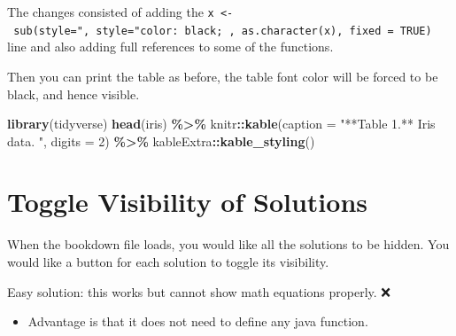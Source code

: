 \documentclass[
  a4paper,
  twoside,
  openright]{book}
\newenvironment{Shaded}{\begin{snugshade}}{\end{snugshade}}
\newcommand{\AttributeTok}[1]{\textcolor[rgb]{0.13,0.29,0.53}{#1}}
\newcommand{\DataTypeTok}[1]{\textcolor[rgb]{0.13,0.29,0.53}{#1}}
\newcommand{\DecValTok}[1]{\textcolor[rgb]{0.00,0.00,0.81}{#1}}
\newcommand{\FunctionTok}[1]{\textcolor[rgb]{0.13,0.29,0.53}{\textbf{#1}}}
\newcommand{\KeywordTok}[1]{\textcolor[rgb]{0.13,0.29,0.53}{\textbf{#1}}}
\newcommand{\NormalTok}[1]{#1}
\newcommand{\OperatorTok}[1]{\textcolor[rgb]{0.81,0.36,0.00}{\textbf{#1}}}
\newcommand{\OtherTok}[1]{\textcolor[rgb]{0.56,0.35,0.01}{#1}}
\newcommand{\SpecialCharTok}[1]{\textcolor[rgb]{0.81,0.36,0.00}{\textbf{#1}}}
\newcommand{\StringTok}[1]{\textcolor[rgb]{0.31,0.60,0.02}{#1}}
\providecommand{\tightlist}{%
  \setlength{\itemsep}{0pt}\setlength{\parskip}{0pt}}
\theoremstyle{definition}
\theoremstyle{definition}
\theoremstyle{definition}
\theoremstyle{definition}
\theoremstyle{remark}
\begin{document}
The changes consisted of adding the \texttt{x\ \textless{}-\ sub(\textquotesingle{}style="\textquotesingle{},\ \textquotesingle{}style="color:\ black;\ \textquotesingle{},\ as.character(x),\ fixed\ =\ TRUE)} line and also adding full references to some of the functions.

Then you can print the table as before, the table font color will be forced to be black, and hence visible.

\begin{Shaded}
\begin{Highlighting}[]
\FunctionTok{library}\NormalTok{(tidyverse)}
\FunctionTok{head}\NormalTok{(iris) }\SpecialCharTok{\%\textgreater{}\%} 
\NormalTok{  knitr}\SpecialCharTok{::}\FunctionTok{kable}\NormalTok{(}\AttributeTok{caption =} \StringTok{"**Table 1.** Iris data. "}\NormalTok{, }\AttributeTok{digits =} \DecValTok{2}\NormalTok{) }\SpecialCharTok{\%\textgreater{}\%} 
\NormalTok{  kableExtra}\SpecialCharTok{::}\FunctionTok{kable\_styling}\NormalTok{()}
\end{Highlighting}
\end{Shaded}

\section{Toggle Visibility of Solutions}\label{toggle-visibility-of-solutions}

When the bookdown file loads, you would like all the solutions to be hidden. You would like a button for each solution to toggle its visibility.

Easy solution: this works but cannot show math equations properly. ❌

\begin{itemize}
\tightlist
\item
  Advantage is that it does not need to define any java function.
\end{itemize}

\begin{Shaded}
\end{Shaded}
\end{document}
